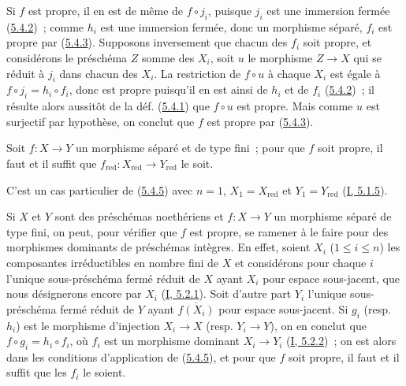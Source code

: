 
Si $f$ est propre, il en est de même de $f\circ j_i$, puisque $j_i$ est une
immersion fermée (\hyperref[II.5.4.2-fr]{5.4.2})~; comme $h_i$ est une
immersion fermée, donc un morphisme séparé, $f_i$ est propre par
(\hyperref[II.5.4.3-fr]{5.4.3}). Supposons inversement que chacun des $f_i$
soit propre, et considérons le préschéma $Z$ somme des $X_i$, soit $u$ le
morphisme $Z\to X$ qui se réduit à $j_i$ dans chacun des $X_i$. La
restriction de $f\circ u$ à chaque $X_i$ est égale à
$f\circ j_i=h_i\circ f_i$, donc est propre puisqu'il en est ainsi de $h_i$
et de $f_i$ (\hyperref[II.5.4.2-fr]{5.4.2})~; il résulte alors aussitôt de
la déf. (\hyperref[II.5.4.1-fr]{5.4.1}) que $f\circ u$ est propre. Mais
comme $u$ est surjectif par hypothèse, on conclut que $f$ est propre par
(\hyperref[II.5.4.3-fr]{5.4.3}).

\begin{corollary}[5.4.6]
\label{II.5.4.6-fr}
Soit $f:X\to Y$ un morphisme séparé et de type fini~; pour que $f$ soit
propre, il faut et il suffit que
$f_{\mathrm{red}}:X_{\mathrm{red}}\to Y_{\mathrm{red}}$ le soit.
\end{corollary}

C'est un cas particulier de (\hyperref[II.5.4.5-fr]{5.4.5}) avec $n=1$,
$X_1=X_{\mathrm{red}}$ et $Y_1=Y_{\mathrm{red}}$
(\hyperref[I.5.1.5-fr]{I, 5.1.5}).

\begin{env}[5.4.7]
\label{II.5.4.7-fr}
Si $X$ et $Y$ sont des préschémas noethériens et $f:X\to Y$ un morphisme
séparé de type fini, on peut, pour vérifier que $f$ est propre, se ramener à
le faire pour des morphismes dominants de préschémas intègres. En effet,
soient $X_i$ ($1\leq i\leq n$) les composantes irréductibles en nombre fini
de $X$ et considérons pour chaque $i$ l'unique sous-préschéma fermé réduit de
$X$ ayant $X_i$ pour espace sous-jacent, que nous désignerons encore par
$X_i$ (\hyperref[I.5.2.1-fr]{I, 5.2.1}). Soit d'autre part $Y_i$ l'unique
sous-préschéma fermé réduit de $Y$ ayant $\overline{f(X_i)}$ pour espace
sous-jacent. Si $g_i$ (resp. $h_i$) est le morphisme d'injection $X_i\to X$
(resp. $Y_i\to Y$), on en conclut que $f\circ g_i=h_i\circ f_i$, où $f_i$
est un morphisme dominant $X_i\to Y_i$
(\hyperref[I.5.2.2-fr]{I, 5.2.2})~; on est alors dans les conditions
d'application de (\hyperref[II.5.4.5-fr]{5.4.5}), et pour que $f$ soit
propre, il faut et il suffit que les $f_i$ le soient.
\end{env}

